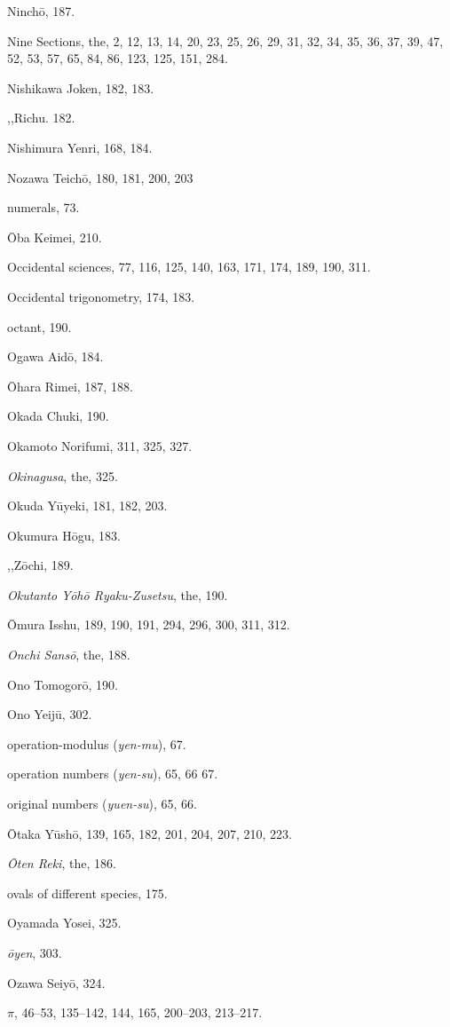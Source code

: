 \documentclass[11pt]{article}
\begin{document}
Ninchō, 187.\par
Nine Sections, the, 2, 12, 13, 14, 20, 23, 25, 26, 29, 31, 32, 34, 35, 36, 37, 39, 47, 52, 53, 57, 65, 84, 86, 123, 125, 151, 284.\par
Nishikawa Joken, 182, 183.\par
\quad ,,\quad Richu. 182.\par
Nishimura Yenri, 168, 184.\par
Nozawa Teichō, 180, 181, 200, 203\par
numerals, 73.\par
\medskip
Ōba Keimei, 210.\par
Occidental sciences, 77, 116, 125, 140, 163, 171, 174, 189, 190, 311.\par
Occidental trigonometry, 174, 183.\par
octant, 190.\par
Ogawa Aidō, 184.\par
Ōhara Rimei, 187, 188.\par
Okada Chuki, 190.\par
Okamoto Norifumi, 311, 325, 327.\par
\emph{Okinagusa}, the, 325.\par
Okuda Yūyeki, 181, 182, 203.\par
Okumura Hōgu, 183.\par
\quad ,,\quad Zōchi, 189.\par
\emph{Okutanto Yōhō Ryaku-Zusetsu}, the, 190.\par
Ōmura Isshu, 189, 190, 191, 294, 296, 300, 311, 312.\par
\emph{Onchi Sansō}, the, 188.\par
Ono Tomogorō, 190.\par
Ono Yeijū, 302.\par
operation-modulus (\emph{yen-mu}), 67.\par
operation numbers (\emph{yen-su}), 65, 66 67.\par
original numbers (\emph{yuen-su}), 65, 66.\par
Ōtaka Yūshō, 139, 165, 182, 201, 204, 207, 210, 223.\par
\emph{Ōten Reki}, the, 186.\par
ovals of different species, 175.\par
Oyamada Yosei, 325.\par
\emph{ōyen}, 303.\par
Ozawa Seiyō, 324.\par
\medskip
$\pi$, 46--53, 135--142, 144, 165, 200--203, 213--217.\par
\end{document}
